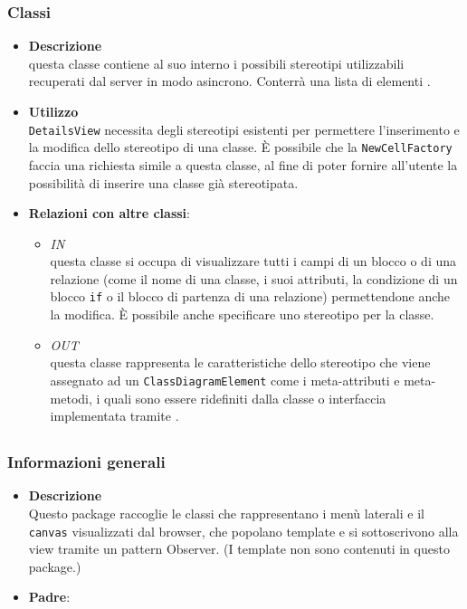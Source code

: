 \subsubsection{Classi}
\label{\nogloxy{swedesigner::client::model::utility::ProjectStereotypes}}
\begin{itemize}
\item \textbf{Descrizione}\\
questa classe contiene al suo interno i possibili stereotipi utilizzabili recuperati dal server in modo asincrono. Conterrà una lista di elementi .
\item \textbf{Utilizzo}\\
\texttt{DetailsView} necessita degli stereotipi esistenti per permettere l'inserimento e la modifica dello stereotipo di una classe. È possibile che la \texttt{NewCellFactory} faccia una richiesta simile a questa classe, al fine di poter fornire all'utente la possibilità di inserire una classe già stereotipata. 
\item \textbf{Relazioni con altre classi}:
\begin{itemize}
\item \textit{IN} \hyperref[\nogloxy{swedesigner::client::view::DetailsView}]{}\\
questa classe si occupa di visualizzare tutti i campi di un blocco o di una relazione (come il nome di una classe, i suoi attributi, la condizione di un blocco \texttt{if} o il blocco di partenza di una relazione) permettendone anche la modifica. È possibile anche specificare uno stereotipo per la classe.

\item \textit{OUT} \hyperref[\nogloxy{swedesigner::client::model::celltypes::HxStereotype}]{}\\
questa classe rappresenta le caratteristiche dello stereotipo che viene assegnato ad un \texttt{ClassDiagramElement} come i meta-attributi e meta-metodi, i quali sono essere ridefiniti dalla classe o interfaccia implementata tramite \proj{}. 
\end{itemize}
\end{itemize}
\subsection{}
\label{\nogloxy{swedesigner::client::view}}
\subsubsection{Informazioni generali}
\begin{itemize}
\item \textbf{Descrizione}\\
Questo package raccoglie le classi che rappresentano i menù laterali e il \texttt{canvas} visualizzati dal browser, che popolano template e si sottoscrivono alla view tramite un pattern Observer. (I template non sono contenuti in questo package.)
\item \textbf{Padre}: \hyperref[\nogloxy{swedesigner::client}]{}
\end{itemize}
